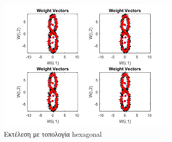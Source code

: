 \documentclass[12pt]{article}
\begin{document}
		\begin{figure}[H]
	 		\centering
			\includegraphics[width=0.8\textwidth]{fakelos/hexagonal_eight.png}
			\caption{Εκτέλεση με τοπολογία hexagonal} 	  
			\label{fig:2}
		\end{figure}
		
\end{document}
